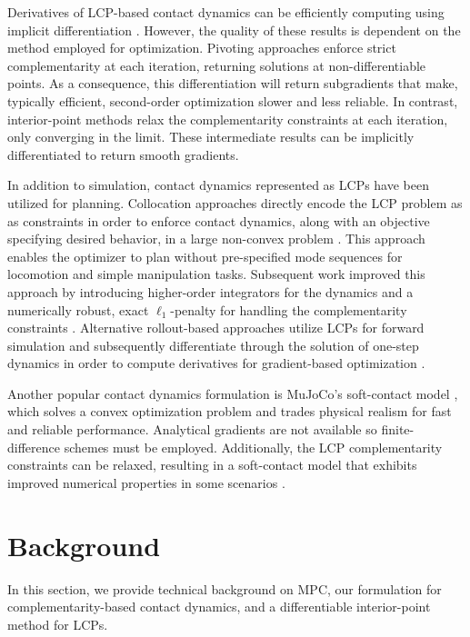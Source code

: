 Derivatives of LCP-based contact dynamics can be efficiently computing using implicit differentiation \cite{dini1907lezioni}. However, the quality of these results is dependent on the method employed for optimization. Pivoting approaches enforce strict complementarity at each iteration, returning solutions at non-differentiable points. As a consequence, this differentiation will return subgradients that make, typically efficient, second-order optimization slower and less reliable. In contrast, interior-point methods relax the complementarity constraints at each iteration, only converging in the limit. These intermediate results can be implicitly differentiated to return smooth gradients.

In addition to simulation, contact dynamics represented as LCPs have been utilized for planning. Collocation approaches \cite{stryk1993numerical} directly encode the LCP problem as  as constraints in order to enforce contact dynamics, along with an objective specifying desired behavior, in a large non-convex problem \cite{posa2014direct}. This approach enables the optimizer to plan without pre-specified mode sequences for locomotion and simple manipulation tasks. Subsequent work improved this approach by introducing higher-order integrators for the dynamics and a numerically robust, exact $\ell_1$-penalty for handling the complementarity constraints \cite{manchester2020variational}. Alternative rollout-based approaches utilize LCPs for forward simulation and subsequently differentiate through the solution of one-step dynamics in order to compute derivatives for gradient-based optimization \cite{de2018end,werling2021fast}.

Another popular contact dynamics formulation is MuJoCo's soft-contact model \cite{todorov2012mujoco}, which solves a convex optimization problem and trades physical realism for fast and reliable performance. Analytical gradients are not available so finite-difference schemes must be employed. Additionally, the LCP complementarity constraints can be relaxed, resulting in a soft-contact model that exhibits improved numerical properties in some scenarios \cite{geilinger2020add}. 

\section{Background} \label{cipc_background}
In this section, we provide technical background on MPC, our formulation for complementarity-based contact dynamics, and a differentiable interior-point method for LCPs.


